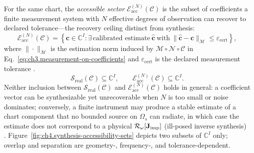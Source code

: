 \label{def:ch4.accessibility-envelope}
For the same chart, the \emph{accessible sector} \(\mathcal{E}_{\mathrm{acc}}^{(N)}(\mathcal{C})\) is the subset of coefficients a finite measurement system with $N$ effective degrees of observation can recover to declared tolerance---the recovery ceiling distinct from synthesis:
\begin{equation}
\label{eq:ch4.accessibility-envelope}
\mathcal{E}_{\mathrm{acc}}^{(N)}(\mathcal{C})
=
\left\{
\mathbf{c}\in\mathbb{C}^{I}:
\exists\,\text{calibrated estimate}\
\widehat{\mathbf{c}}\ \text{with}\
\|\widehat{\mathbf{c}}-\mathbf{c}\|_{\mathcal{M}}\le \varepsilon_{\mathrm{cert}}
\right\},
\end{equation}
where \(\|\cdot\|_{\mathcal{M}}\) is the estimation norm induced by
\(\mathcal{M}\circ\mathcal{N}\circ\mathcal{C}\) in Eq.~\eqref{eq:ch3.measurement-on-coefficients}
and \(\varepsilon_{\mathrm{cert}}\) is the declared measurement tolerance
\cite{harrington2001}.
\begin{equation}
\label{eq:ch4.set-inclusions}
\mathcal{S}_{\mathrm{real}}(\mathcal{C})
\subseteq
\mathbb{C}^{I},
\qquad
\mathcal{E}_{\mathrm{acc}}^{(N)}(\mathcal{C})
\subseteq
\mathbb{C}^{I}.
\end{equation}
Neither inclusion between $\mathcal{S}_{\mathrm{real}}(\mathcal{C})$ and $\mathcal{E}_{\mathrm{acc}}^{(N)}(\mathcal{C})$ holds in general: a coefficient vector can be synthesizable yet unrecoverable when $N$ is too small or noise dominates; conversely, a finite instrument may produce a stable estimate of a chart component that no bounded source on $\Omega_s$ can radiate, in which case the estimate does not correspond to a physical $\mathcal{R}_\omega[\mathbf{J}_{\mathrm{imp}}]$ (ill-posed inverse synthesis) \cite{devaney2004,hansen1988}. Figure~\ref{fig:ch4.synthesis-accessibility-sets} depicts two subsets of $\mathbb{C}^{I}$ only; overlap and separation are geometry-, frequency-, and tolerance-dependent.

